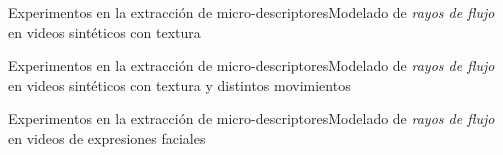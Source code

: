 \documentclass{beamer}
\begin{document}
	\begin{frame}{Experimentos en la extracción de micro-descriptores}{Modelado de \textit{rayos de flujo} en videos sintéticos con textura}
		\begin{center}
		\end{center}		
	\end{frame}	
	
	\begin{frame}{Experimentos en la extracción de micro-descriptores}{Modelado de \textit{rayos de flujo} en videos sintéticos con textura y distintos movimientos}
		\begin{center}
		\end{center}		
	\end{frame}	
	
		\begin{frame}{Experimentos en la extracción de micro-descriptores}{Modelado de \textit{rayos de flujo} en videos de expresiones faciales}
			\begin{center}
			\end{center}		
		\end{frame}
	
	
\end{document}
